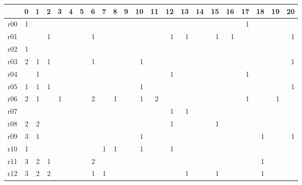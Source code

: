 {\scriptsize
\begin{tabular}{l*{21}{r}} \toprule
& 0& 1& 2& 3& 4& 5& 6& 7& 8& 9& 10& 11& 12& 13& 14& 15& 16& 17& 18& 19& 20\\ \midrule 
r00& \cellcolor{magenta!10} 1& & & & & & & & & & & & & & & & & \cellcolor{magenta!10} 1& & & \\ 
r01& & & \cellcolor{magenta!10} 1& & & & \cellcolor{magenta!10} 1& & & & & & \cellcolor{magenta!10} 1& \cellcolor{magenta!10} 1& & \cellcolor{magenta!10} 1& \cellcolor{magenta!10} 1& & & & \cellcolor{magenta!10} 1\\ 
r02& \cellcolor{magenta!10} 1& & & & & & & & & & & & & & & & & & & & \\ 
r03& \cellcolor{magenta!10} 2& \cellcolor{magenta!10} 1& \cellcolor{magenta!10} 1& & & & \cellcolor{magenta!10} 1& & & & \cellcolor{magenta!10} 1& & & & & & & & & & \cellcolor{magenta!10} 1\\ 
r04& & \cellcolor{cyan!10} 1& & & & & & & & & & & \cellcolor{cyan!10} 1& & & & & \cellcolor{cyan!10} 1& & & \\ 
r05& \cellcolor{magenta!10} 1& \cellcolor{magenta!10} 1& \cellcolor{magenta!10} 1& & & & & & & & \cellcolor{magenta!10} 1& & & & & & & & & & \cellcolor{magenta!10} 1\\ 
r06& \cellcolor{cyan!10} 2& \cellcolor{cyan!10} 1& & \cellcolor{cyan!10} 1& & & \cellcolor{cyan!10} 2& & \cellcolor{cyan!10} 1& & \cellcolor{cyan!10} 1& \cellcolor{cyan!10} 2& & & & & & \cellcolor{cyan!10} 1& & \cellcolor{cyan!10} 1& \\ 
r07& & & & & & & & & & & & & \cellcolor{cyan!10} 1& \cellcolor{cyan!10} 1& & & & & & & \\ 
r08& \cellcolor{white} 2& \cellcolor{white} 2& & & & & & & & & & & \cellcolor{cyan!10} 1& & & \cellcolor{cyan!10} 1& & & & & \\ 
r09& \cellcolor{magenta!10} 3& \cellcolor{magenta!10} 1& & & & & & & & & \cellcolor{magenta!10} 1& & & & & & & & \cellcolor{magenta!10} 1& & \cellcolor{magenta!10} 1\\ 
r10& \cellcolor{cyan!10} 1& & & & & & & \cellcolor{cyan!10} 1& \cellcolor{cyan!10} 1& & \cellcolor{cyan!10} 1& & \cellcolor{cyan!10} 1& & & & & & & & \\ 
r11& \cellcolor{magenta!10} 3& \cellcolor{magenta!10} 2& \cellcolor{magenta!10} 1& & & & \cellcolor{magenta!10} 2& & & & & & & & & & & & \cellcolor{magenta!10} 1& & \\ 
r12& \cellcolor{white} 3& \cellcolor{cyan!10} 2& \cellcolor{cyan!10} 2& & & & \cellcolor{cyan!10} 1& \cellcolor{cyan!10} 1& & & & & & \cellcolor{cyan!10} 1& & \cellcolor{cyan!10} 1& & & \cellcolor{cyan!10} 1& & \\ 

\end{tabular}}
